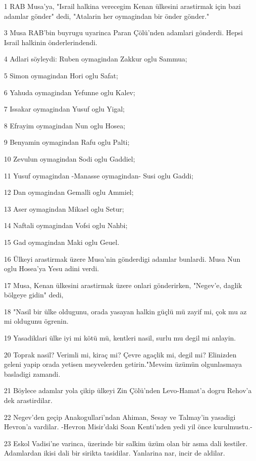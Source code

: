 \par 1 RAB Musa'ya, "Israil halkina verecegim Kenan ülkesini arastirmak için bazi adamlar gönder" dedi, "Atalarin her oymagindan bir önder gönder."
\par 3 Musa RAB'bin buyrugu uyarinca Paran Çölü'nden adamlari gönderdi. Hepsi Israil halkinin önderlerindendi.
\par 4 Adlari söyleydi: Ruben oymagindan Zakkur oglu Sammua;
\par 5 Simon oymagindan Hori oglu Safat;
\par 6 Yahuda oymagindan Yefunne oglu Kalev;
\par 7 Issakar oymagindan Yusuf oglu Yigal;
\par 8 Efrayim oymagindan Nun oglu Hosea;
\par 9 Benyamin oymagindan Rafu oglu Palti;
\par 10 Zevulun oymagindan Sodi oglu Gaddiel;
\par 11 Yusuf oymagindan -Manasse oymagindan- Susi oglu Gaddi;
\par 12 Dan oymagindan Gemalli oglu Ammiel;
\par 13 Aser oymagindan Mikael oglu Setur;
\par 14 Naftali oymagindan Vofsi oglu Nahbi;
\par 15 Gad oymagindan Maki oglu Geuel.
\par 16 Ülkeyi arastirmak üzere Musa'nin gönderdigi adamlar bunlardi. Musa Nun oglu Hosea'ya Yesu adini verdi.
\par 17 Musa, Kenan ülkesini arastirmak üzere onlari gönderirken, "Negev'e, daglik bölgeye gidin" dedi,
\par 18 "Nasil bir ülke oldugunu, orada yasayan halkin güçlü mü zayif mi, çok mu az mi oldugunu ögrenin.
\par 19 Yasadiklari ülke iyi mi kötü mü, kentleri nasil, surlu mu degil mi anlayin.
\par 20 Toprak nasil? Verimli mi, kiraç mi? Çevre agaçlik mi, degil mi? Elinizden geleni yapip orada yetisen meyvelerden getirin."Mevsim üzümün olgunlasmaya basladigi zamandi.
\par 21 Böylece adamlar yola çikip ülkeyi Zin Çölü'nden Levo-Hamat'a dogru Rehov'a dek arastirdilar.
\par 22 Negev'den geçip Anakogullari'ndan Ahiman, Sesay ve Talmay'in yasadigi Hevron'a vardilar. -Hevron Misir'daki Soan Kenti'nden yedi yil önce kurulmustu.-
\par 23 Eskol Vadisi'ne varinca, üzerinde bir salkim üzüm olan bir asma dali kestiler. Adamlardan ikisi dali bir sirikta tasidilar. Yanlarina nar, incir de aldilar.
